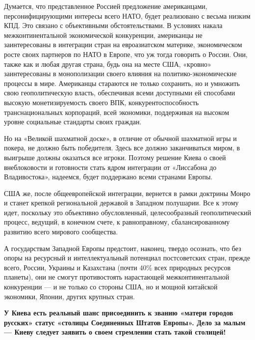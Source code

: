 Думается, что представленное Россией предложение американцами,
персонифицирующими интересы всего НАТО, будет реализовано с весьма низким КПД.
Это связано с объективными обстоятельствами. В условиях накала
межконтинентальной экономической конкуренции, американцы не заинтересованы в
интеграции стран на евроазиатском материке, экономическом росте своих партнеров
по НАТО в Европе, что уж тогда говорить о России. Они, также как и любая другая
страна, будь она на месте США, «кровно» заинтересованы в монополизации своего
влияния на политико-экономические процессы в мире. Американцы стараются не
только сохранить, но и умножить свою геополитическую власть, обеспечивая всеми
доступными ей способами высокую монетизируемость своего ВПК,
конкурентоспособность транснациональных корпораций, всей экономики, поддерживая
на высоком уровне социальные стандарты своих граждан.

Но на «Великой шахматной доске», в отличие от обычной шахматной игры и покера,
не должно быть победителя. Здесь все должно заканчиваться миром, в выигрыше
должны оказаться все игроки. Поэтому решение Киева о своей внеблоковости и
готовности стать ядром интеграции от «Лиссабона до Владивостока», надеемся,
будет поддержано всеми странами Европы.

США же, после общеевропейской интеграции, вернется в рамки доктрины Монро и
станет крепкой региональной державой в Западном полушарии. Все к этому идет,
поскольку это объективно обусловленный, целесообразный геополитический процесс,
ведущий, в конечном счете, к равноправному, сбалансированному развитию всего
мирового сообщества.

А государствам Западной Европы предстоит, наконец, твердо осознать, что без
опоры на ресурсный и интеллектуальный потенциал постсоветских стран, прежде
всего, России, Украины и Казахстана (почти 40\% всех природных ресурсов
планеты), они не смогут противостоять нарастающей межконтинентальной
конкуренции — и не только со стороны США, но и мощной китайской экономики,
Японии, других крупных стран.

\textbf{У Киева есть реальный шанс присоединить к званию «матери городов русских»
статус «столицы Соединенных Штатов Европы». Дело за малым — Киеву следует
заявить о своем стремлении стать такой столицей!}

